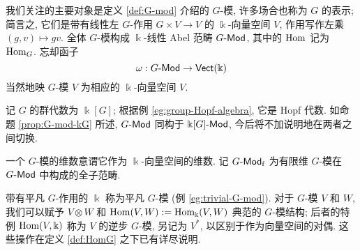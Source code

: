 我们关注的主要对象是定义 \ref{def:G-mod} 介绍的 $G$-模, 许多场合也称为 $G$ 的表示; 简言之, 它们是带有线性左 $G$-作用 $G \times V \to V$ 的 $\Bbbk$-向量空间 $V$, 作用写作左乘 $(g, v) \mapsto gv$. 全体 $G$-模构成 $\Bbbk$-线性 Abel 范畴 $G\text{-}\mathsf{Mod}$, 其中的 $\operatorname{Hom}$ 记为 $\operatorname{Hom}_G$. 忘却函子
\[ \omega: G\text{-}\mathsf{Mod} \to \mathsf{Vect}(\Bbbk) \]
当然地映 $G$-模 $V$ 为相应的 $\Bbbk$-向量空间 $V$.

记 $G$ 的群代数为 $\Bbbk[G]$; 根据例 \ref{eg:group-Hopf-algebra}, 它是 Hopf 代数. 如命题 \ref{prop:G-mod-kG} 所述, $G\text{-}\mathsf{Mod}$ 同构于 $\Bbbk[G]\text{-}\mathsf{Mod}$, 今后将不加说明地在两者之间切换.

\begin{convention}
	一个 $G$-模的维数意谓它作为 $\Bbbk$-向量空间的维数. 记 $G\text{-}\mathsf{Mod}_{\mathrm{f}}$ 为有限维 $G$-模在 $G\text{-}\mathsf{Mod}$ 中构成的全子范畴.
\end{convention}

带有平凡 $G$-作用的 $\Bbbk$ 称为平凡 $G$-模 (例 \ref{eg:trivial-G-mod}). 对于 $G$-模 $V$ 和 $W$, 我们可以赋予 $V \otimes W$ 和 $\operatorname{Hom}(V, W) := \operatorname{Hom}_{\Bbbk}(V, W)$ 典范的 $G$-模结构; 后者的特例 $\operatorname{Hom}(V, \Bbbk)$ 称为 $V$ 的逆步 $G$-模, 另记为 $V^*$, 以区别于作为向量空间的对偶. 这些操作在定义 \ref{def:HomG} 之下已有详尽说明.

